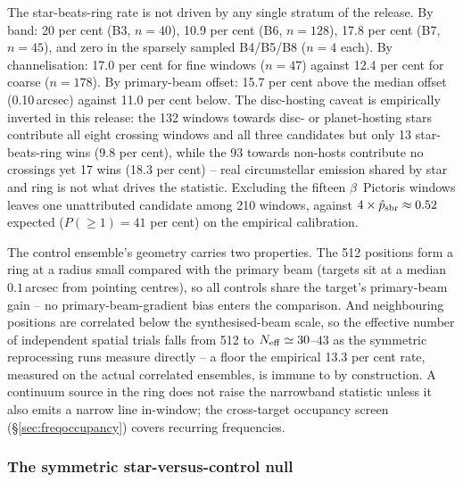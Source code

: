 \documentclass{openjournal}
\begin{document}
The star-beats-ring rate is not driven by any single stratum of the
release. By band: 20 per cent (B3, $n=40$), 10.9 per cent (B6,
$n=128$), 17.8 per cent (B7, $n=45$), and zero in the sparsely
sampled B4/B5/B8 ($n=4$ each). By channelisation: 17.0 per cent for
fine windows ($n=47$) against 12.4 per cent for coarse ($n=178$). By
primary-beam offset: 15.7 per cent above the median offset
(0.10\,arcsec) against 11.0 per cent below. The disc-hosting caveat
is empirically inverted in this release: the 132 windows towards
disc- or planet-hosting stars contribute all eight crossing windows
and all three candidates but only 13 star-beats-ring wins (9.8 per
cent), while the 93 towards non-hosts contribute no crossings yet 17
wins (18.3 per cent) -- real circumstellar emission shared by star
and ring is not what drives the statistic. Excluding the fifteen
$\beta$~Pictoris windows leaves one unattributed candidate among 210
windows, against $4\times\hat{p}_{\rm sbr}\approx0.52$ expected
($P(\geq1)=41$ per cent) on the empirical calibration.

The control ensemble's geometry carries two properties. The 512
positions form a ring at a radius small compared with the primary
beam (targets sit at a median $0.1$\,arcsec from pointing centres),
so all controls share the target's primary-beam gain -- no
primary-beam-gradient bias enters the comparison. And neighbouring
positions are correlated below the synthesised-beam scale, so the
effective number of independent spatial trials falls from 512 to
$N_{\rm eff}\simeq30$--$43$ as the symmetric reprocessing runs measure
directly -- a floor the empirical 13.3 per cent rate, measured on the
actual correlated ensembles, is immune to by construction. A
continuum source in the ring does not raise the narrowband statistic
unless it also emits a narrow line in-window; the cross-target
occupancy screen (\S\ref{sec:freqoccupancy}) covers recurring
frequencies.

\subsubsection*{The symmetric star-versus-control null}
\end{document}
